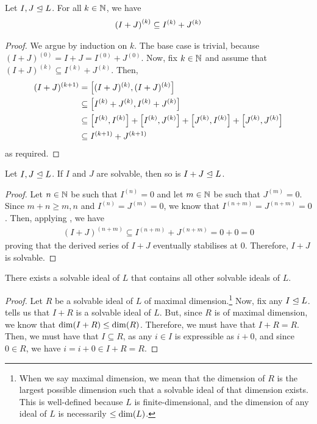 \begin{boxlemma}\label{Ch1:Lemma:DerivedSeries_sum_contained_sum_derivedSeries}
    Let $I, J \trianglelefteq L$. For all $k \in \mathbb{N}$, we have
    \begin{align*}
        \left( I + J \right)^{(k)} \subseteq I^{(k)} + J^{(k)}
    \end{align*}
\end{boxlemma}
\begin{proof}
    We argue by induction on $k$. The base case is trivial, because $(I + J)^{(0)} = I + J = I^{(0)} + J^{(0)}$. Now, fix $k \in \mathbb{N}$ and assume that $(I + J)^{(k)} \subseteq I^{(k)} + J^{(k)}$. Then,
    \begin{align*}
        (I + J)^{(k + 1)} &= \left[ (I + J)^{(k)}, (I + J)^{(k)} \right] \\
        &\subseteq \left[ I^{(k)} + J^{(k)}, I^{(k)} + J^{(k)} \right] \\
        &\subseteq \left[ I^{(k)}, I^{(k)} \right] + \left[ I^{(k)}, J^{(k)} \right] + \left[ J^{(k)}, I^{(k)} \right] + \left[ J^{(k)}, J^{(k)} \right] \\
        &\subseteq I^{(k + 1)} + J^{(k + 1)}
    \end{align*}
    as required.
\end{proof}

\begin{boxlemma}\label{Ch1:Lemma:SumIdealSolvable}
    Let $I, J \trianglelefteq L$. If $I$ and $J$ are solvable, then so is $I + J \trianglelefteq L$.
\end{boxlemma}
\begin{proof}
    Let $n \in \mathbb{N}$ be such that $I^{(n)} = 0$ and let $m \in \mathbb{N}$ be such that $J^{(m)} = 0$. Since $m + n \geq m, n$ and $I^{(n)} = J^{(m)} = 0$, we know that $I^{(n + m)} = J^{(n + m)} = 0$. Then, applying , we have
    \begin{align*}
        (I + J)^{(n + m)} \subseteq I^{(n + m)} + J^{(n + m)} = 0 + 0 = 0
    \end{align*}
    proving that the derived series of $I + J$ eventually stabilises at $0$. Therefore, $I + J$ is solvable.
\end{proof}

\begin{boxcorollary}\label{Ch1:Cor:RadExists}
    There exists a solvable ideal of $L$ that contains all other solvable ideals of $L$.
\end{boxcorollary}
\begin{proof}
    Let $R$ be a solvable ideal of $L$ of maximal dimension.\footnote{When we say maximal dimension, we mean that the dimension of $R$ is the largest possible dimension such that a solvable ideal of that dimension exists. This is well-defined because $L$ is finite-dimensional, and the dimension of any ideal of $L$ is necessarily $\leq \dim\!\left( L \right)$.} Now, fix any $I \trianglelefteq L$.  tells us that $I + R$ is a solvable ideal of $L$. But, since $R$ is of maximal dimension, we know that $\dim\!\left( I + R \right) \leq \dim\!\left( R \right)$. Therefore, we must have that $I + R = R$. Then, we must have that $I \subseteq R$, as any $i \in I$ is expressible as $i + 0$, and since $0 \in R$, we have $i = i + 0 \in I + R = R$.
\end{proof}

